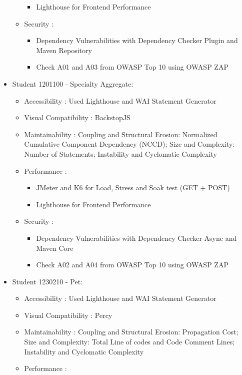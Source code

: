 \documentclass[a4paper,11pt,openright,BCOR=15mm]{scrbook}
\begin{document}
\begin{itemize}
\begin{itemize}
\begin{itemize}
					\item Lighthouse for Frontend Performance
				\end{itemize}	
				\item Security : 
				\begin{itemize}
					\item Dependency Vulnerabilities with Dependency
					Checker Plugin and Maven Repository
					\item Check A01 and A03 from OWASP Top 10 using OWASP ZAP
				\end{itemize}	
			\end{itemize}	
			\item Student 1201100 - Specialty Aggregate: 
			\begin{itemize}
				\item Accessibility : Used Lighthouse and WAI Statement Generator
				\item Visual Compatibility : BackstopJS
				\item Maintainability :  Coupling and Structural Erosion: Normalized Cumulative Component Dependency (NCCD);
				Size and Complexity: Number of Statements; Instability and Cyclomatic Complexity
				\item Performance : 
				\begin{itemize}
					\item JMeter and K6 for Load, Stress and Soak test (GET + POST)
					\item Lighthouse for Frontend Performance
				\end{itemize}	
				\item Security : 
				\begin{itemize}
					\item Dependency Vulnerabilities with Dependency Checker
					Async and Maven Core
					\item Check A02 and A04 from OWASP Top 10 using OWASP ZAP
				\end{itemize}	
			\end{itemize}
			\item Student 1230210 - Pet:
			\begin{itemize}
				\item Accessibility : Used Lighthouse and WAI Statement Generator
				\item Visual Compatibility : Percy
				\item Maintainability :  Coupling and Structural Erosion: Propagation Cost;
				Size and Complexity: Total Line of codes and Code Comment Lines; Instability and Cyclomatic Complexity
				\item Performance : 

\end{itemize}
\end{itemize}
\end{document}
